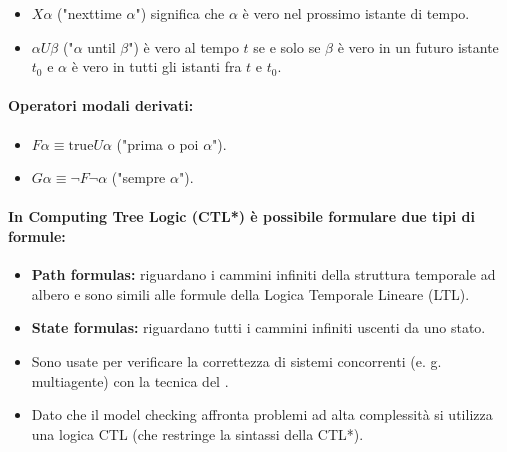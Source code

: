 \begin{itemize}
    \item $X \alpha$ ("nexttime $\alpha$") significa che $\alpha$ è vero nel prossimo istante di tempo.
    \item $\alpha U \beta$ ("$\alpha$ until $\beta$") è vero al tempo $t$ se e solo se $\beta$ è vero in un futuro istante $t_0$ e $\alpha$ è vero in tutti gli istanti fra $t$ e $t_0$.
\end{itemize}

\paragraph{Operatori modali derivati:}  

\begin{itemize}
    \item $F \alpha \equiv \text{true} U \alpha$ ("prima o poi $\alpha$").
    \item $G \alpha \equiv \neg F \neg \alpha$ ("sempre $\alpha$").
\end{itemize}

\paragraph{In Computing Tree Logic (CTL*) è possibile formulare due tipi di formule:}

\begin{itemize}
    \item \textbf{Path formulas:} riguardano i cammini infiniti della struttura temporale ad albero e sono simili alle formule della Logica Temporale Lineare (LTL).
    \item \textbf{State formulas:} riguardano tutti i cammini infiniti uscenti da uno stato.
\end{itemize}


\begin{itemize}
  \item Sono usate per verificare la correttezza di sistemi concorrenti (e. g. multiagente) con la tecnica del . 
  \item Dato che il model checking affronta problemi ad alta complessità si utilizza una logica CTL (che restringe la sintassi della CTL*).
\end{itemize}


